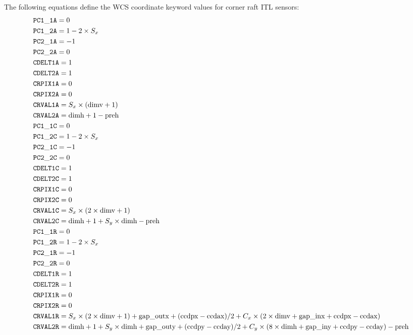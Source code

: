 \documentclass{article}[12pt]
\begin{document}
{The following equations define the WCS coordinate keyword values for corner raft ITL sensors:
\begin{align*}
& {\tt PC1\_1A} = 0 \\
& {\tt PC1\_2A} = 1 - 2 \times S_x \\
& {\tt PC2\_1A} = -1 \\
& {\tt PC2\_2A} = 0 \\
& {\tt CDELT1A} = 1 \\
& {\tt CDELT2A} = 1 \\
& {\tt CRPIX1A} = 0 \\
& {\tt CRPIX2A} = 0 \\
& {\tt CRVAL1A} = S_x \times({\rm dimv} + 1) \\
& {\tt CRVAL2A} = {\rm dimh} + 1 - {\rm preh} \\
& {\tt PC1\_1C} = 0 \\
& {\tt PC1\_2C} = 1 - 2 \times S_x \\
& {\tt PC2\_1C} = -1 \\
& {\tt PC2\_2C} = 0 \\
& {\tt CDELT1C} = 1 \\
& {\tt CDELT2C} = 1 \\
& {\tt CRPIX1C} = 0 \\
& {\tt CRPIX2C} = 0 \\
& {\tt CRVAL1C} = S_x \times(2 \times {\rm dimv} + 1) \\
& {\tt CRVAL2C} = {\rm dimh} + 1 + S_y \times {\rm dimh} - {\rm preh} \\
& {\tt PC1\_1R} = 0 \\
& {\tt PC1\_2R} = 1 - 2 \times S_x \\
& {\tt PC2\_1R} = -1 \\
& {\tt PC2\_2R} = 0 \\
& {\tt CDELT1R} = 1 \\
& {\tt CDELT2R} = 1 \\
& {\tt CRPIX1R} = 0 \\
& {\tt CRPIX2R} = 0 \\
& {\tt CRVAL1R} = S_x \times(2 \times {\rm dimv} + 1) + {\rm gap\_outx} + ({\rm ccdpx} - {\rm ccdax})/2 + C_x \times (2 \times {\rm dimv} + {\rm gap\_inx} + {\rm ccdpx} - {\rm ccdax}) \\
& {\tt CRVAL2R} = {\rm dimh} + 1 + S_y \times {\rm dimh} + {\rm gap\_outy} + ({\rm ccdpy} - {\rm ccday})/2 + C_y \times ( 8 \times {\rm dimh} + {\rm gap\_iny} + {\rm ccdpy} - {\rm ccday}) - {\rm preh} \\

\end{align*}}
\end{document}
